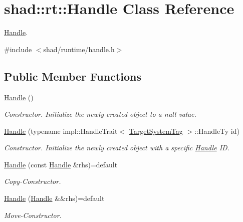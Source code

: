 \hypertarget{classshad_1_1rt_1_1Handle}{\section{shad\-:\-:rt\-:\-:Handle Class Reference}
\label{classshad_1_1rt_1_1Handle}
}


\hyperlink{classshad_1_1rt_1_1Handle}{Handle}.  




{\ttfamily \#include $<$shad/runtime/handle.\-h$>$}

\subsection*{Public Member Functions}
\begin{DoxyCompactItemize}
\item 
\hyperlink{classshad_1_1rt_1_1Handle_a642ef80d2b3f9e7be83ad670e9e5647d}{Handle} ()
\begin{DoxyCompactList}\small\item\em Constructor. Initialize the newly created object to a null value. \end{DoxyCompactList}\item 
\hyperlink{classshad_1_1rt_1_1Handle_a89e01b9aec4d19ee362c214ab40ce23d}{Handle} (typename impl\-::\-Handle\-Trait$<$ \hyperlink{namespaceshad_1_1rt_a1eb8df1be67eada9b4f647ff376695b0}{Target\-System\-Tag} $>$\-::Handle\-Ty id)
\begin{DoxyCompactList}\small\item\em Constructor. Initialize the newly created object with a specific \hyperlink{classshad_1_1rt_1_1Handle}{Handle} I\-D. \end{DoxyCompactList}\item 
\hyperlink{classshad_1_1rt_1_1Handle_a85f4228715be948a34a89f03239b39ae}{Handle} (const \hyperlink{classshad_1_1rt_1_1Handle}{Handle} \&rhs)=default
\begin{DoxyCompactList}\small\item\em Copy-\/\-Constructor. \end{DoxyCompactList}\item 
\hyperlink{classshad_1_1rt_1_1Handle_a1d10a24cdb304d822dd700c88af2d105}{Handle} (\hyperlink{classshad_1_1rt_1_1Handle}{Handle} \&\&rhs)=default
\begin{DoxyCompactList}\small\item\em Move-\/\-Constructor. \end{DoxyCompactList}\item 

\end{DoxyCompactItemize}
